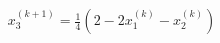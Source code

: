 \documentclass[preview]{standalone}
\begin{document}
\begin{align*}
x_3^{(k+1)} = \frac{1}{4}(2 - 2x_1^{(k)} - x_2^{(k)})
\end{align*}
\end{document}
